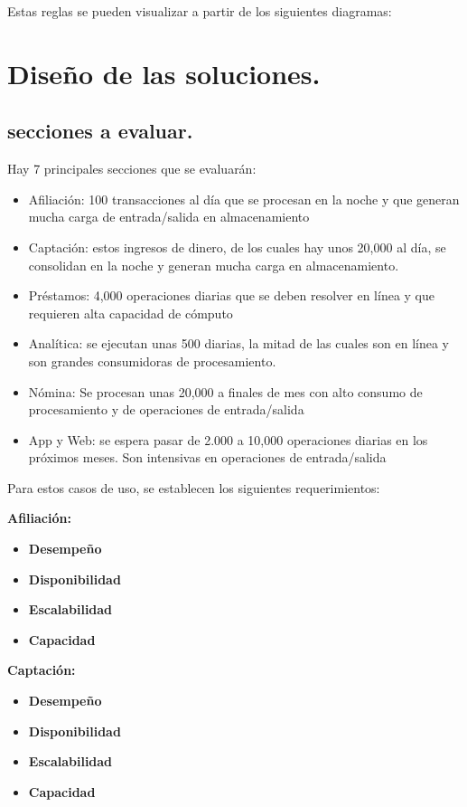 \documentclass[a4paper]{article}
\begin{document}
Estas reglas se pueden visualizar a partir de los siguientes diagramas:



\section{Diseño de las soluciones.}

\subsection{secciones a evaluar.}
Hay 7 principales secciones que se evaluarán:
\begin{itemize}
    \item Afiliación: 100 transacciones al día que se procesan en la noche y que generan mucha carga de
    entrada/salida en almacenamiento
    \item Captación: estos ingresos de dinero, de los cuales hay unos 20,000 al día, se consolidan en la noche y
    generan mucha carga en almacenamiento.
    \item Préstamos: 4,000 operaciones diarias que se deben resolver en línea y que requieren alta capacidad de
    cómputo
    \item Analítica: se ejecutan unas 500 diarias, la mitad de las cuales son en línea y son grandes consumidoras de
    procesamiento.
    \item Nómina: Se procesan unas 20,000 a finales de mes con alto consumo de procesamiento y de operaciones
    de entrada/salida
    \item App y Web: se espera pasar de 2.000 a 10,000 operaciones diarias en los próximos meses. Son intensivas
    en operaciones de entrada/salida
\end{itemize}

Para estos casos de uso, se establecen los siguientes requerimientos:

\textbf{Afiliación:}
\begin{itemize}
    \item \textbf{Desempeño}
    \item \textbf{Disponibilidad}
    \item \textbf{Escalabilidad}
    \item \textbf{Capacidad}
\end{itemize}

\textbf{Captación:}
\begin{itemize}
    \item \textbf{Desempeño}
    \item \textbf{Disponibilidad}
    \item \textbf{Escalabilidad}
    \item \textbf{Capacidad}
\end{itemize}
\end{document}

